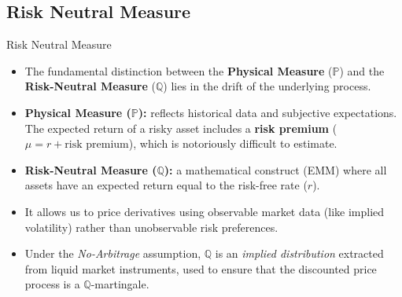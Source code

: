 \documentclass{beamer}
\begin{document}
	\subsection{Risk Neutral Measure}
	\begin{frame}{Risk Neutral Measure}
		\begin{itemize}
			\item The fundamental distinction between the \textbf{Physical Measure} ($\mathbb{P}$) and the \textbf{Risk-Neutral Measure} ($\mathbb{Q}$) lies in the \textcolor{maincolor}{drift of the underlying process}.

			\item \textbf{Physical Measure ($\mathbb{P}$):} reflects historical data and subjective expectations. The expected return of a risky asset includes a \textbf{risk premium} ($\mu = r + \text{risk premium}$), which is notoriously difficult to estimate.

			\item \textbf{Risk-Neutral Measure ($\mathbb{Q}$):} a mathematical construct (EMM) where all assets have an expected return equal to the \textcolor{maincolor}{risk-free rate} ($r$).

			\item It allows us to price derivatives using observable market data (like implied volatility) rather than unobservable risk preferences.

			\item Under the \textit{No-Arbitrage} assumption, $\mathbb{Q}$ is an \textit{implied distribution} extracted from liquid market instruments, used to ensure that the discounted price process is a \textcolor{maincolor}{$\mathbb{Q}$-martingale}.
		\end{itemize}
	\end{frame}

%
\end{document}
